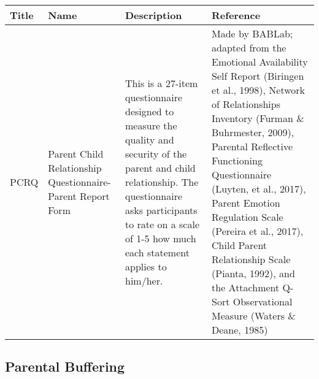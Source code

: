 \documentclass[]{book}
\begin{document}
\begin{longtable}[]{@{}llll@{}}
\toprule
\begin{minipage}[b]{0.22\columnwidth}\raggedright
Title\strut
\end{minipage} & \begin{minipage}[b]{0.27\columnwidth}\raggedright
Name\strut
\end{minipage} & \begin{minipage}[b]{0.22\columnwidth}\raggedright
Description\strut
\end{minipage} & \begin{minipage}[b]{0.18\columnwidth}\raggedright
Reference\strut
\end{minipage}\tabularnewline
\midrule
\endhead
\begin{minipage}[t]{0.22\columnwidth}\raggedright
PCRQ\strut
\end{minipage} & \begin{minipage}[t]{0.27\columnwidth}\raggedright
Parent Child Relationship Questionnaire- Parent Report Form\strut
\end{minipage} & \begin{minipage}[t]{0.22\columnwidth}\raggedright
This is a 27-item questionnaire designed to measure the quality and security of the parent and child relationship. The questionnaire asks participants to rate on a scale of 1-5 how much each statement applies to him/her.\strut
\end{minipage} & \begin{minipage}[t]{0.18\columnwidth}\raggedright
Made by BABLab; adapted from the Emotional Availability Self Report (Biringen et al., 1998), Network of Relationships Inventory (Furman \& Buhrmester, 2009), Parental Reflective Functioning Questionnaire (Luyten, et al., 2017), Parent Emotion Regulation Scale (Pereira et al., 2017), Child Parent Relationship Scale (Pianta, 1992), and the Attachment Q-Sort Observational Measure (Waters \& Deane, 1985)\strut
\end{minipage}\tabularnewline
\bottomrule
\end{longtable}

\hypertarget{parental-buffering}{%
\subsection{Parental Buffering}\label{parental-buffering}}
\end{document}
